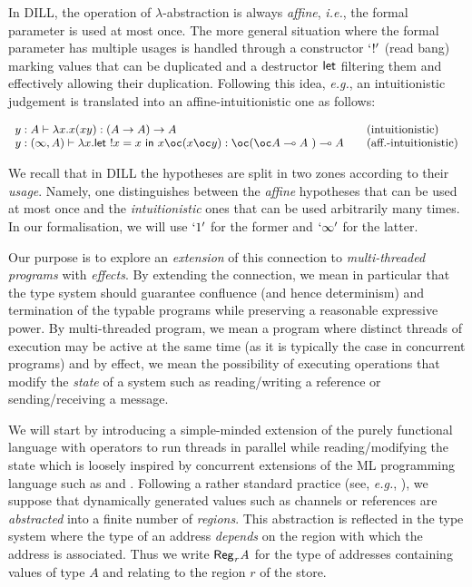 \documentclass[11pt]{article}
\newcommand{\Gives}{\vdash}             \newcommand{\IGives}{\vdash_{I}}        \newcommand{\AIGives}{\vdash_{{\it AI}}} \newcommand{\CGives}{\vdash_{C}}
\newcommand{\arrow}{\rightarrow}        \newcommand{\trarrow}{\stackrel{*}{\rightarrow}}        \newcommand{\limp}{\multimap} \newcommand{\bang}{\oc}
\newcommand{\letm}[3]{{\sf let} \ ! #1 = #2 \ {\sf in} \ #3}    \newcommand{\tertype}{{\bf 1}}
\newcommand{\s}[1]{{\sf #1}}    \newcommand{\vc}[1]{{\bf #1}}
\newcommand{\rgtype}[2]{{\it {\sf Reg}_{#1} #2}}
\begin{document}
In DILL, the operation of $\lambda$-abstraction is
always {\em affine}, {\em i.e.}, the formal parameter is used at most
once.  The more general situation where the formal parameter has
multiple usages is handled through a constructor $`!'$ (read bang) 
marking values that can be duplicated and a destructor $\s{let}$ 
filtering them and effectively allowing their
duplication. Following this idea, {\em e.g.},  an intuitionistic judgement 
is translated into an affine-intuitionistic one as follows:

{\footnotesize
\[
\begin{array}{lll}
y:A \Gives \lambda x.x(xy): (A\arrow A) \arrow A &\mbox{(intuitionistic)} \\
y:(\infty,A) \Gives \lambda x.\letm{x}{x}{x\bang(x\bang y)}
:\bang(\bang A\limp A\ )\limp A \quad
&\mbox{(aff.-intuitionistic)}
\end{array}
\]}

We recall that in DILL the hypotheses are split in two zones according to their {\em usage}.
Namely, one distinguishes between the {\em affine} hypotheses 
that can be used at most once and the {\em intuitionistic} ones 
that can be used arbitrarily many times. In our formalisation, we will use $`1'$
for the former and $`\infty'$ for the latter.

Our purpose is to explore an {\em extension} of this connection to {\em
multi-threaded programs} with {\em effects}. 
By extending the connection, we mean in particular
that the type system should guarantee confluence (and hence determinism) and termination
of the typable programs while preserving a reasonable expressive power.
By multi-threaded program, we mean a program where distinct threads of execution may be active at
the same time (as it is typically the case in concurrent programs) and by
effect, we mean the possibility of executing operations that modify
the {\em state} of a system such as reading/writing a reference or
sending/receiving a message. 


We will start by introducing a simple-minded extension of the purely
functional language with operators to run threads in parallel while
reading/modifying the state which is loosely inspired by concurrent
extensions of the ML programming language such as 
\cite{GMP89} and \cite{Reppy91}.  Following a rather
standard practice (see, {\em e.g.}, \cite{LG88,TT97}), we suppose that
dynamically generated values such as channels or references  are
{\em abstracted} into a finite number of {\em regions}. This abstraction is
reflected in the type system where the type of an address {\em
depends} on the region with which the address is associated. Thus we 
write $\rgtype{r}{A}$ for the type of addresses containing values of
type $A$ and relating to the region $r$ of the store.
\end{document}
